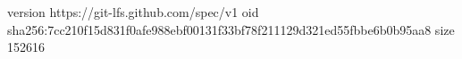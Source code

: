 version https://git-lfs.github.com/spec/v1
oid sha256:7cc210f15d831f0afe988ebf00131f33bf78f211129d321ed55fbbe6b0b95aa8
size 152616
